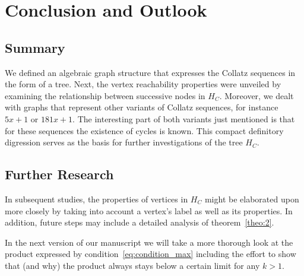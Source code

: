 \chapter{Conclusion and Outlook}

\section{Summary}
We defined an algebraic graph structure that expresses the Collatz sequences in the form of a tree. Next, the vertex reachability properties were unveiled by examining the relationship between successive nodes in $H_C$. Moreover, we dealt with graphs that represent other variants of Collatz sequences, for instance $5x+1$ or $181x+1$. The interesting part of both variants just mentioned is that for these sequences the existence of cycles is known. This compact definitory digression serves as the basis for further investigations of the tree $H_C$.

\section{Further Research}
In subsequent studies, the properties of vertices in $H_C$ might be elaborated upon more closely by taking into account a vertex's label as well as its properties. In addition, future steps may include a detailed analysis of theorem~\ref{theo:2}.

In the next version of our manuscript we will take a more thorough look at the product expressed by condition~\ref{eq:condition_max} including the effort to show that (and why) the product always stays below a certain limit for any $k>1$.
